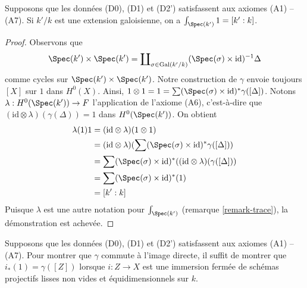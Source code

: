 \begin{lemma}
\label{lemma-integrate-1}
Supposons que les données (D0), (D1) et (D2') satisfassent aux axiomes (A1) -- (A7).
Si $k'/k$ est une extension galoisienne, on a
$\int_{\Spec(k')} 1 = [k' : k]$.
\end{lemma}

\begin{proof}
Observons que
$$
\Spec(k') \times \Spec(k') =
\coprod\nolimits_{\sigma \in \text{Gal}(k'/k)}
(\Spec(\sigma) \times \text{id})^{-1} \Delta
$$
comme cycles sur $\Spec(k') \times \Spec(k')$.
Notre construction de $\gamma$ envoie toujours $[X]$ sur $1$ dans $H^0(X)$. Ainsi,
$1 \otimes 1 = 1 = \sum (\Spec(\sigma) \times \text{id})^*\gamma([\Delta])$.
Notons $\lambda : H^0(\Spec(k')) \to F$ l'application de
l'axiome (A6), c'est-à-dire que $(\text{id} \otimes \lambda)(\gamma(\Delta)) = 1$
dans $H^0(\Spec(k'))$. On obtient
\begin{align*}
\lambda(1) 1
& =
(\text{id} \otimes \lambda)(1 \otimes 1) \\
& =
(\text{id} \otimes \lambda)(
\sum (\Spec(\sigma) \times \text{id})^*\gamma([\Delta])) \\
& =
\sum (\Spec(\sigma) \times \text{id})^*(
(\text{id} \otimes \lambda)(\gamma([\Delta])) \\
& =
\sum (\Spec(\sigma) \times \text{id})^*(1) \\
& =
[k' : k]
\end{align*}
Puisque $\lambda$ est une autre notation pour $\int_{\Spec(k')}$
(remarque \ref{remark-trace}), la démonstration est achevée.
\end{proof}

\begin{lemma}
\label{lemma-enough}
Supposons que les données (D0), (D1) et (D2') satisfassent aux axiomes (A1) -- (A7).
Pour montrer que $\gamma$ commute à l'image directe, il suffit
de montrer que $i_*(1) = \gamma([Z])$ lorsque $i : Z \to X$ est une immersion
fermée de schémas projectifs lisses non vides et équidimensionnels sur $k$.
\end{lemma}

